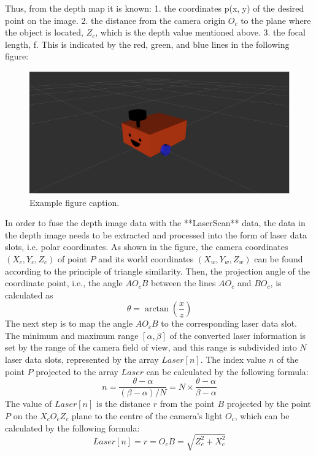 Thus, from the depth map it is known: 1. the coordinates p(x, y) of the desired point on the image. 2. the distance from the camera origin $O_c$ to the plane where the object is located, $Z_c$, which is the depth value mentioned above. 3. the focal length, f. This is indicated by the red, green, and blue lines in the following figure:
\begin{figure}[H]
    \centering
    \includegraphics[width=0.8\linewidth]{figs/robot.png}
    \caption{Example figure caption.}
\end{figure}
In order to fuse the depth image data with the **LaserScan** data, the data in the depth image needs to be extracted and processed into the form of laser data slots, i.e. polar coordinates. As shown in the figure, the camera coordinates $(X_c, Y_c, Z_c)$ of point $P$ and its world coordinates $(X_w, Y_w, Z_w)$ can be found according to the principle of triangle similarity. Then, the projection angle of the coordinate point, i.e., the angle $AO_cB$ between the lines $AO_c$ and $BO_c$, is calculated as 
\begin{equation}
    \theta=\arctan{(\frac{x}{z})}
\end{equation}
The next step is to map the angle $AO_cB$ to the corresponding laser data slot. The minimum and maximum range $[\alpha, \beta]$ of the converted laser information is set by the range of the camera field of view, and this range is subdivided into $N$ laser data slots, represented by the array $Laser[n]$. The index value $n$ of the point $P$ projected to the array $Laser$ can be calculated by the following formula:
\begin{equation}
    n=\frac{\theta-\alpha}{(\beta-\alpha)/N}=N\times\frac{\theta-\alpha}{\beta-\alpha}
\end{equation}
The value of $Laser[n]$ is the distance $r$ from the point $B$ projected by the point $P$ on the $X_cO_cZ_c$ plane to the centre of the camera's light $O_c$, which can be calculated by the following formula: 
\begin{equation}
    Laser[n]=r=O_cB=\sqrt{Z_c^2+X_c^2}
\end{equation}

